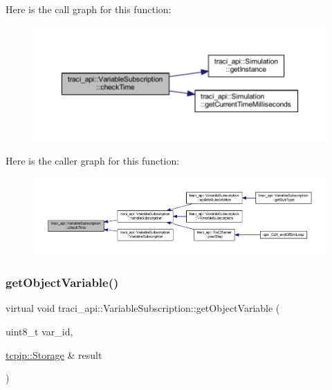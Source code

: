 Here is the call graph for this function\+:\nopagebreak
\begin{figure}[H]
\begin{center}
\leavevmode
\includegraphics[width=350pt]{classtraci__api_1_1_variable_subscription_a6e17a9560c53c7c9543599f93caeeaf8_cgraph}
\end{center}
\end{figure}
Here is the caller graph for this function\+:\nopagebreak
\begin{figure}[H]
\begin{center}
\leavevmode
\includegraphics[width=350pt]{classtraci__api_1_1_variable_subscription_a6e17a9560c53c7c9543599f93caeeaf8_icgraph}
\end{center}
\end{figure}
\mbox{\label{classtraci__api_1_1_variable_subscription_a884dba03a44455e86c417c3641ec6aa4}} 
\subsubsection{\texorpdfstring{get\+Object\+Variable()}{getObjectVariable()}}
{\footnotesize\ttfamily virtual void traci\+\_\+api\+::\+Variable\+Subscription\+::get\+Object\+Variable (\begin{DoxyParamCaption}\item[{uint8\+\_\+t}]{var\+\_\+id,  }\item[{\hyperlink{classtcpip_1_1_storage}{tcpip\+::\+Storage} \&}]{result }\end{DoxyParamCaption})\hspace{0.3cm}{\ttfamily [pure virtual]}}



